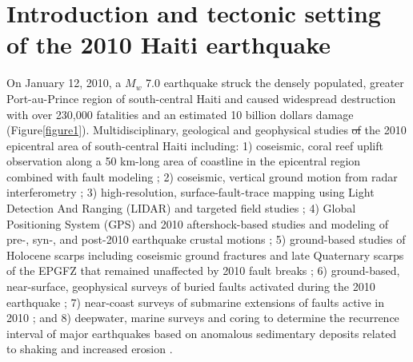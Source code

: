 \documentclass[linenumbers,draft]{agujournal}
\providecommand{\DIFadd}[1]{{\protect\color{blue}\uwave{#1}}} %
\providecommand{\DIFdel}[1]{{\protect\color{red}\sout{#1}}}                      %
\providecommand{\DIFaddbegin}{} %
\providecommand{\DIFaddend}{} %
\providecommand{\DIFdelbegin}{} %
\providecommand{\DIFdelend}{} %
\begin{document}
\section{Introduction and tectonic setting of the 2010 Haiti earthquake}
\label{sec:intro}
On January 12, 2010, a $M_w$ 7.0 earthquake struck the densely populated, greater Port-au-Prince region of south-central Haiti and caused widespread destruction with over 230,000 fatalities and an estimated 10 billion dollars damage \citep{prentice2010seismic,bilham2010lessons,paultre2013damage,kocel2016near} (Figure\DIFaddbegin \DIFadd{~}\DIFaddend \ref{figure1}). Multidisciplinary, geological and geophysical studies \DIFdelbegin \DIFdel{of }\DIFdelend \DIFaddbegin \DIFadd{about }\DIFaddend the 2010 epicentral area of south-central Haiti \DIFaddbegin \DIFadd{have been done, }\DIFaddend including: 1) coseismic, coral reef uplift observation along a 50 km-long area of coastline in the epicentral region combined with fault modeling \citep{hayes2010complex}; 2) coseismic, vertical ground motion from radar interferometry \citep{hashimoto2011fan}; 3) high-resolution, surface-fault-trace mapping using Light Detection And Ranging (LIDAR) and targeted field studies \citep{cowgill2012interactive}; 4) Global Positioning System (GPS) and 2010 aftershock-based studies and modeling of pre-, syn-, and post-2010 earthquake crustal motions \citep{calais2010transpressional,nettles2010earthquake,symithe2013coseismic,douilly2013crustal,douilly2015three}; 5) ground-based studies of Holocene scarps including coseismic ground fractures and late Quaternary scarps of the EPGFZ that remained unaffected by 2010 fault breaks \citep{prentice2010seismic,koehler2011field,rathje2014geotechnical,saint2015seismotectonics}; 6) ground-based, near-surface, geophysical surveys of buried faults activated during the 2010 earthquake \citep{kocel2016near}; 7) near-coast surveys of submarine extensions of faults active in 2010 \citep{hornbach2010high,mercier20112010}; and 8) deepwater, marine surveys and coring to determine the recurrence interval of major earthquakes based on anomalous sedimentary deposits related to shaking and increased erosion \citep{mchugh2011offshore}. \DIFdelbegin %
\end{document}
